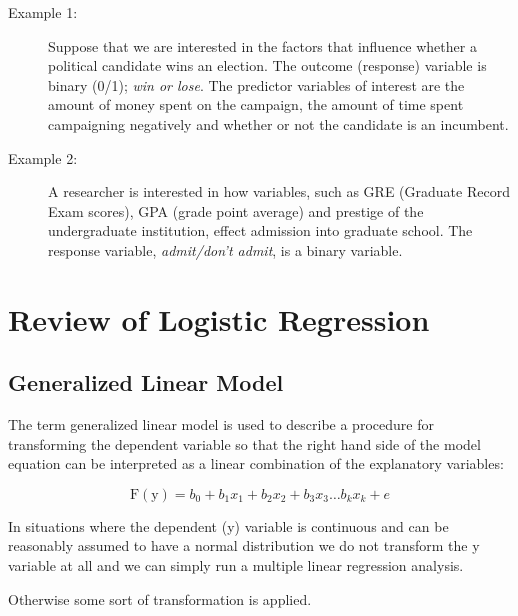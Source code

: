 ﻿\documentclass[a4paper,12pt]{article}
\begin{document}
\begin{description}
	\item[Example 1:]  Suppose that we are interested in the factors that influence whether a political candidate wins an election.  The outcome (response) variable is binary (0/1); \textit{ win or lose}.  The predictor variables of interest are the amount of money spent on the campaign, the amount of time spent campaigning negatively and whether or not the candidate is an incumbent.
	
	\item[Example 2:]  A researcher is interested in how variables, such as GRE (Graduate Record Exam scores), GPA (grade point average) and prestige of the undergraduate institution, effect admission into graduate school. The response variable, \textit{admit/don't admit}, is a binary variable.
\end{description}


\section{Review of Logistic Regression}

\subsection{Generalized Linear Model}

The term generalized linear model is used to describe a procedure for
transforming the dependent variable so that the right hand side of the model
equation can be interpreted as a linear combination of the explanatory variables:

\[ \operatorname{F(y)} = b_0 + b_1x_1 + b_2x_2 + b_3x_3 \ldots b_kx_k + e \]

In situations where the dependent (y) variable is continuous and can be
reasonably assumed to have a normal distribution we do not transform the y
variable at all and we can simply run a multiple linear regression analysis.

Otherwise some sort of transformation is applied.
\end{document}
